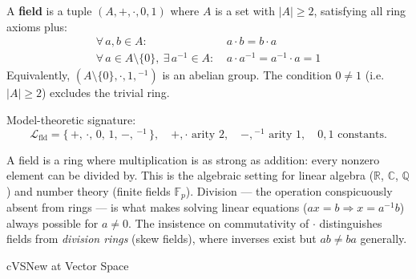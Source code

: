 \begin{definition}[Field]
  A \textbf{field} is a tuple $(A, +, \cdot, 0, 1)$ where $A$ is a set with
  $|A| \geq 2$, satisfying all ring axioms plus:
  \begin{align*}
    \forall\,a,b \in A:\ & a \cdot b = b \cdot a \tag{Commutativity of $\cdot$}\\
    \forall\,a \in A\setminus\{0\},\ \exists\,a^{-1} \in A:\ &
      a \cdot a^{-1} = a^{-1} \cdot a = 1 \tag{Multiplicative Inverses}
  \end{align*}
  Equivalently, $(A\setminus\{0\}, \cdot, 1, {}^{-1})$ is an abelian group.
  The condition $0 \ne 1$ (i.e.\ $|A|\ge 2$) excludes the trivial ring.

  \medskip\noindent
  Model-theoretic signature:
  \[
    \mathcal{L}_{\mathrm{fld}} = \{\,+,\,\cdot,\,0,\,1,\,-,\,{}^{-1}\,\},
    \quad +,\cdot \text{ arity } 2,\quad -,{}^{-1} \text{ arity } 1,\quad
    0,1 \text{ constants.}
  \]
\end{definition}

\begin{remark}
  A field is a ring where multiplication is as strong as addition: every nonzero
  element can be divided by.  This is the algebraic setting for linear algebra
  ($\mathbb{R}$, $\mathbb{C}$, $\mathbb{Q}$) and number theory (finite fields
  $\mathbb{F}_p$).  Division — the operation conspicuously absent from rings —
  is what makes solving linear equations ($ax = b \Rightarrow x = a^{-1}b$)
  always possible for $a \ne 0$.  The insistence on commutativity of $\cdot$
  distinguishes fields from \emph{division rings} (skew fields), where inverses
  exist but $ab \ne ba$ generally.
\end{remark}



\clearpage\thispagestyle{plain}

\begin{bpnew}{cVS}{New at Vector Space}
\end{bpnew}

